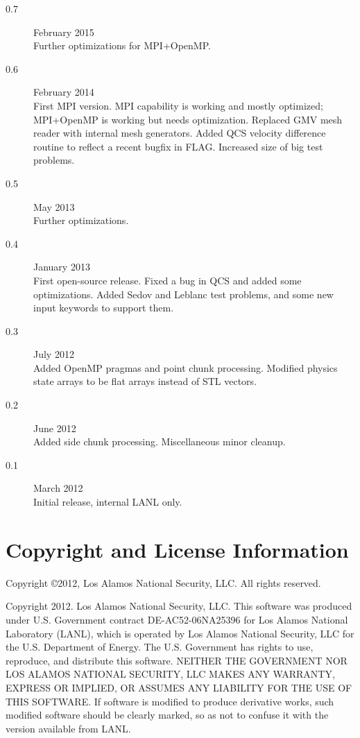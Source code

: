 \documentclass[11pt,letterpaper]{article}
\begin{document}
\begin{description}
\item[0.7] February 2015 \\
     Further optimizations for MPI+OpenMP.

\item[0.6] February 2014 \\
     First MPI version.  MPI capability is working and mostly
     optimized; MPI+OpenMP is working but needs optimization.
     Replaced GMV mesh reader with internal mesh generators.
     Added QCS velocity difference routine to reflect a recent
     bugfix in FLAG.  Increased size of big test problems.

\item[0.5] May 2013 \\
     Further optimizations.

\item[0.4] January 2013 \\
     First open-source release.  Fixed a bug in QCS and added some
     optimizations.  Added Sedov and Leblanc test problems, and some
     new input keywords to support them.

\item[0.3] July 2012 \\
     Added OpenMP pragmas and point chunk processing.  Modified physics
     state arrays to be flat arrays instead of STL vectors.

\item[0.2] June 2012 \\
     Added side chunk processing.  Miscellaneous minor cleanup.

\item[0.1] March 2012 \\
     Initial release, internal LANL only.
\end{description}

\section{Copyright and License Information}

Copyright \copyright 2012, Los Alamos National Security, LLC.
All rights reserved.

Copyright 2012. Los Alamos National Security, LLC.
This software was produced under U.S. Government contract
DE-AC52-06NA25396 for Los Alamos National Laboratory (LANL), which is
operated by Los Alamos National Security, LLC for the U.S. Department
of Energy. The U.S. Government has rights to use, reproduce, and
distribute this software. NEITHER THE GOVERNMENT NOR LOS ALAMOS
NATIONAL SECURITY, LLC MAKES ANY WARRANTY, EXPRESS OR IMPLIED, OR
ASSUMES ANY LIABILITY FOR THE USE OF THIS SOFTWARE. If software is
modified to produce derivative works, such modified software should be
clearly marked, so as not to confuse it with the version available from
LANL.
\end{document}
